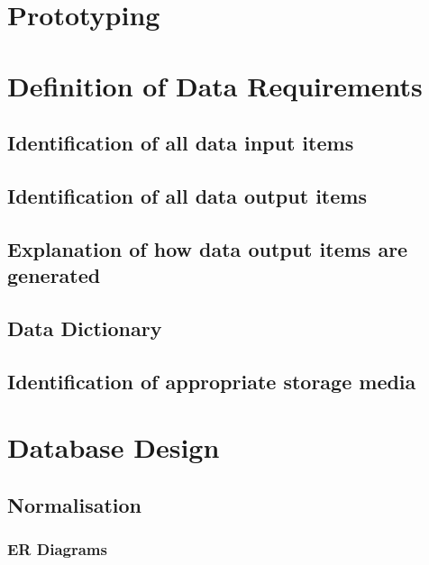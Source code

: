 \section{Prototyping}

\section{Definition of Data Requirements}

\subsection{Identification of all data input items}

\subsection{Identification of all data output items}

\subsection{Explanation of how data output items are generated}

\subsection{Data Dictionary}

\subsection{Identification of appropriate storage media}

\section{Database Design}

\subsection{Normalisation}

\pagebreak
\subsubsection{ER Diagrams}

